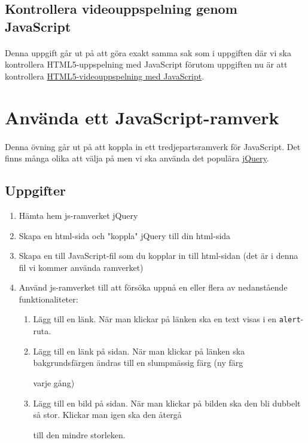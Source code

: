 \documentclass{article}
\begin{document}
  \subsection{ Kontrollera videouppspelning genom JavaScript }
    \paragraph{}
    Denna uppgift går ut på att göra exakt samma sak som i uppgiften där vi ska kontrollera HTML5-uppspelning med JavaScript förutom uppgiften nu är att kontrollera \href{http://msdn.microsoft.com/en-us/library/ie/hh924823(v=vs.85).aspx}{HTML5-videouppspelning med JavaScript}.



\newpage
\section{ Använda ett JavaScript-ramverk }
\paragraph{}
Denna övning går ut på att koppla in ett tredjepartsramverk för JavaScript. Det finns många olika att välja på men vi ska använda det populära 
\href{http://jquery.com/download/}{jQuery}.

\subsection*{Uppgifter}
\begin{enumerate}
	\item Hämta hem js-ramverket jQuery
	\item Skapa en html-sida och "koppla" jQuery till din html-sida
	\item Skapa en till JavaScript-fil som du kopplar in till html-sidan (det är i denna fil vi kommer använda ramverket)
	\item Använd js-ramverket till att försöka uppnå en eller flera av nedanstående funktionaliteter:
	\begin{enumerate}
		\item Lägg till en länk. När man klickar på länken ska en text visas i en \texttt{alert}-ruta.
		\item Lägg till en länk på sidan. När man klickar på länken ska bakgrundsfärgen ändras till en slumpmässig färg (ny färg 
		
		varje gång)
		\item Lägg till en bild på sidan. När man klickar på bilden ska den bli dubbelt så stor. Klickar man igen ska den återgå 
		
		till den mindre storleken.
	\end{enumerate}
\end{enumerate}
\end{document}
